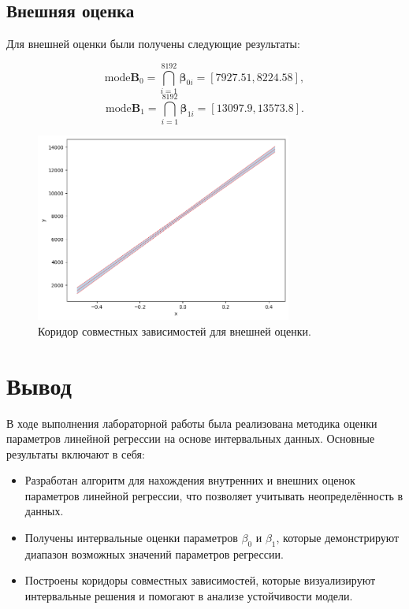 \documentclass{article}
\begin{document}
  \subsection{Внешняя оценка}

  Для внешней оценки были получены следующие результаты:

  \[
    \text{mode} \mathbf{B}_0 = \bigcap_{i=1}^{8192} \mathbf{\beta}_{0i}
      = [7927.51, 8224.58],
  \]
  \[
    \text{mode} \mathbf{B}_1 = \bigcap_{i=1}^{8192} \mathbf{\beta}_{1i}
      = [13097.9, 13573.8].
  \]

  \begin{figure}[htbp!]
		\begin{center}
			\includegraphics[width = 0.75\textwidth]{ext_est}
			\caption{Коридор совместных зависимостей для внешней оценки.}
      \label{figure:ext_est}
		\end{center}
	\end{figure}

  \section{Вывод}

  В ходе выполнения лабораторной работы была реализована методика оценки
  параметров линейной регрессии на основе интервальных данных. Основные
  результаты включают в себя:

  \begin{itemize}
    \item Разработан алгоритм для нахождения внутренних и внешних оценок
      параметров линейной регрессии, что позволяет учитывать
      неопределённость в данных.
    \item Получены интервальные оценки параметров \( \beta_0 \) и
      \( \beta_1 \), которые демонстрируют диапазон возможных значений
      параметров регрессии.
    \item Построены коридоры совместных зависимостей, которые
      визуализируют интервальные решения и помогают в анализе устойчивости
      модели.
  \end{itemize}
\end{document}
